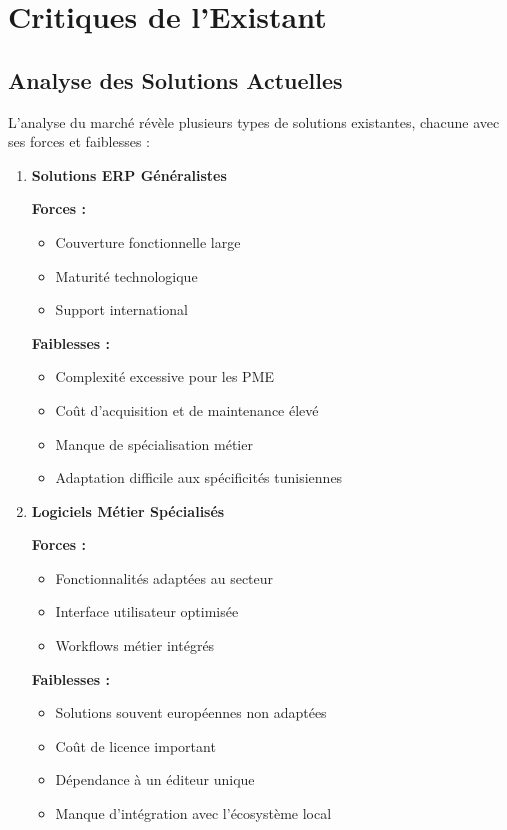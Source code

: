 \section{Critiques de l'Existant}

\subsection{Analyse des Solutions Actuelles}

L'analyse du marché révèle plusieurs types de solutions existantes, chacune avec ses forces et faiblesses :

\begin{enumerate}
    \item \textbf{Solutions ERP Généralistes}
    
    \textbf{Forces :}
    \begin{itemize}
        \item Couverture fonctionnelle large
        \item Maturité technologique
        \item Support international
    \end{itemize}
    
    \textbf{Faiblesses :}
    \begin{itemize}
        \item Complexité excessive pour les PME
        \item Coût d'acquisition et de maintenance élevé
        \item Manque de spécialisation métier
        \item Adaptation difficile aux spécificités tunisiennes
    \end{itemize}
    
    \item \textbf{Logiciels Métier Spécialisés}
    
    \textbf{Forces :}
    \begin{itemize}
        \item Fonctionnalités adaptées au secteur
        \item Interface utilisateur optimisée
        \item Workflows métier intégrés
    \end{itemize}
    
    \textbf{Faiblesses :}
    \begin{itemize}
        \item Solutions souvent européennes non adaptées
        \item Coût de licence important
        \item Dépendance à un éditeur unique
        \item Manque d'intégration avec l'écosystème local
    \end{itemize}
    

\end{enumerate}
